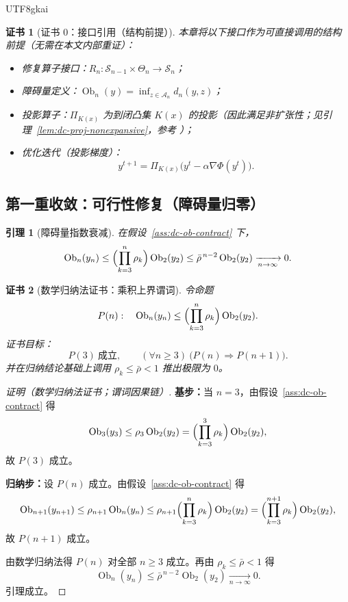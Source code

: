 \documentclass[12pt]{article}
\newtheorem{lemma}{引理}[section]
\newtheorem{Certificate}{证书}[section]
\newcommand{\Ob}{\operatorname{Ob}}
\begin{document}
\begin{CJK*}{UTF8}{gkai}
\begin{Certificate}[证书 0：接口引用（结构前提）]\label{cert:dc-interface}
本章将以下接口作为可直接调用的结构前提（无需在本文内部重证）：
\begin{itemize}
\item 修复算子接口：$R_n:\mathcal S_{n-1}\times\Theta_n\to\mathcal S_n$；
\item 障碍量定义：$\Ob_n(y)=\inf_{z\in\mathcal A_n}d_n(y,z)$；
\item 投影算子：$\Pi_{K(x)}$ 为到闭凸集 $K(x)$ 的投影（因此满足非扩张性；见引理~\ref{lem:dc-proj-nonexpansive}，参考 \cite{BauschkeCombettes2017}）；
\item 优化迭代（投影梯度）：
\[
y^{t+1}=\Pi_{K(x)}\bigl(y^t-\alpha\nabla\Phi(y^t)\bigr).
\]
\end{itemize}
\end{Certificate}

\subsection{第一重收敛：可行性修复（障碍量归零）}
\label{subsec:double-convergence-feasibility}

\begin{lemma}[障碍量指数衰减]\label{lem:dc-ob-decay}
在假设~\ref{ass:dc-ob-contract} 下，
\[
\Ob_n(y_n)
\le
\Bigl(\prod_{k=3}^n \rho_k\Bigr)\Ob_2(y_2)
\le
\bar\rho^{\,n-2}\Ob_2(y_2)
\xrightarrow[n\to\infty]{}0.
\]
\end{lemma}

\begin{Certificate}[数学归纳法证书：乘积上界谓词]\label{cert:dc-ob-decay}
令命题
\[
P(n):\quad \Ob_n(y_n)\le\Bigl(\prod_{k=3}^n\rho_k\Bigr)\Ob_2(y_2).
\]
证书目标：
\[
P(3)\ \text{成立},\qquad (\forall n\ge 3)\ \bigl(P(n)\Rightarrow P(n+1)\bigr).
\]
并在归纳结论基础上调用 $\rho_k\le\bar\rho<1$ 推出极限为 $0$。
\end{Certificate}

\begin{proof}[证明（数学归纳法证书；谓词因果链）]
\textbf{基步：}当 $n=3$，由假设~\ref{ass:dc-ob-contract} 得
\[
\Ob_3(y_3)\le\rho_3\Ob_2(y_2)=\Bigl(\prod_{k=3}^{3}\rho_k\Bigr)\Ob_2(y_2),
\]
故 $P(3)$ 成立。

\textbf{归纳步：}设 $P(n)$ 成立。由假设~\ref{ass:dc-ob-contract} 得
\[
\Ob_{n+1}(y_{n+1})\le \rho_{n+1}\Ob_n(y_n)
\le \rho_{n+1}\Bigl(\prod_{k=3}^n\rho_k\Bigr)\Ob_2(y_2)
=\Bigl(\prod_{k=3}^{n+1}\rho_k\Bigr)\Ob_2(y_2),
\]
故 $P(n+1)$ 成立。

由数学归纳法得 $P(n)$ 对全部 $n\ge 3$ 成立。再由 $\rho_k\le\bar\rho<1$ 得
\[
\Ob_n(y_n)\le\bar\rho^{\,n-2}\Ob_2(y_2)\xrightarrow[n\to\infty]{}0.
\]
引理成立。
\end{proof}


\end{CJK*}
\end{document}
